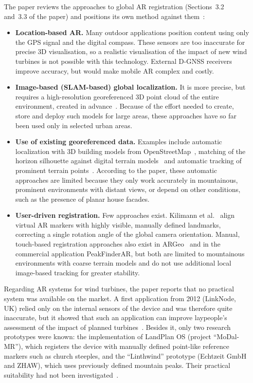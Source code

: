 The paper reviews the approaches to global AR registration (Sections~3.2 and~3.3 of the paper) and positions its own method against them~\cite{burkard2022gistam}:

\begin{itemize}
    \item \textbf{Location-based AR.} Many outdoor applications position content using only the GPS signal and the digital compass. These sensors are too inaccurate for precise 3D visualisation, so a realistic visualisation of the impact of new wind turbines is not possible with this technology. External D-GNSS receivers improve accuracy, but would make mobile AR complex and costly.
    \item \textbf{Image-based (SLAM-based) global localization.} It is more precise, but requires a high-resolution georeferenced 3D point cloud of the entire environment, created in advance~\cite{zamir2018geoloc,kim2018ismar}. Because of the effort needed to create, store and deploy such models for large areas, these approaches have so far been used only in selected urban areas.
    \item \textbf{Use of existing georeferenced data.} Examples include automatic localization with 3D building models from OpenStreetMap~\cite{liu2019slam}, matching of the horizon silhouette against digital terrain models~\cite{baatz2012} and automatic tracking of prominent terrain points~\cite{brejcha2020landscapear}. According to the paper, these automatic approaches are limited because they only work accurately in mountainous, prominent environments with distant views, or depend on other conditions, such as the presence of planar house facades.
    \item \textbf{User-driven registration.} Few approaches exist. Kilimann et al.~\cite{kilimann2019ar} align virtual AR markers with highly visible, manually defined landmarks, correcting a single rotation angle of the global camera orientation. Manual, touch-based registration approaches also exist in ARGeo~\cite{gazcon2018argeo} and in the commercial application PeakFinderAR, but both are limited to mountainous environments with coarse terrain models and do not use additional local image-based tracking for greater stability.
\end{itemize}

Regarding AR systems for wind turbines, the paper reports that no practical system was available on the market. A first application from 2012 (LinkNode, UK) relied only on the internal sensors of the device and was therefore quite inaccurate, but it showed that such an application can improve laypeople's assessment of the impact of planned turbines~\cite{szymanek2015}. Besides it, only two research prototypes were known: the implementation of LandPlan OS (project ``MoDal-MR''), which registers the device with manually defined point-like reference markers such as church steeples, and the ``Linthwind'' prototype (Echtzeit GmbH and ZHAW), which uses previously defined mountain peaks. Their practical suitability had not been investigated~\cite{burkard2022gistam}.

